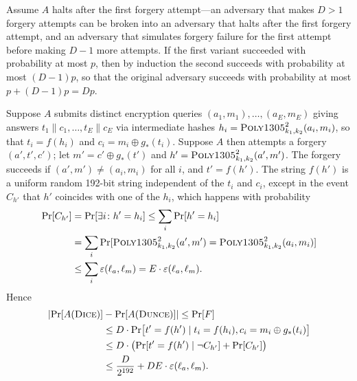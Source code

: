 \documentclass{article}
\def\operatorsc#1{{%
  \ifmmode\let\next=\operatorname\else\let\next=\relax\fi\next{\textsc{#1}}}}
\def\Poly#1/{\operatorsc{Poly#1}}
\def\DUNCE/{\operatorsc{Dunce}}
\def\DICE/{\operatorsc{Dice}}
\newcommand{\concat}{\mathbin\|}
\newcommand{\given}{\mathrel|}
\newcommand{\collisionbound}{\varepsilon}
\begin{document}
Assume $A$ halts after the first forgery attempt---an adversary that
 makes $D>1$ forgery attempts can be broken into an adversary that
 halts after the first forgery attempt, and an adversary that
 simulates forgery failure for the first attempt before making $D-1$
 more attempts.
If the first variant succeeded with probability at most $p$, then by
 induction the second succeeds with probability at most $(D - 1) p$,
 so that the original adversary succeeds with probability at most
 $p + (D - 1) p = D p$.

Suppose $A$ submits distinct encryption queries
 $(a_1, m_1), \dotsc, (a_E, m_E)$
 giving answers
 $t_1 \concat c_1, \dotsc, t_E \concat c_E$
 via intermediate hashes
 $h_i = \Poly1305/^2_{k_1,k_2}(a_i, m_i)$,
 so that $t_i = f(h_i)$ and $c_i = m_i \oplus g_*(t_i)$.
Suppose $A$ then attempts a forgery $(a', t', c')$; let
 $m' = c' \oplus g_*(t')$
 and
 $h' = \Poly1305/^2_{k_1,k_2}(a', m')$.
The forgery succeeds if $(a', m') \ne (a_i, m_i)$ for all $i$, and
 $t' = f(h')$.
The string $f(h')$ is a uniform random 192-bit string independent of
 the $t_i$ and $c_i$, except in the event $C_{h'}$ that $h'$ coincides
 with one of the $h_i$, which happens with probability
%
\begin{align*}
  \Pr[C_{h'}]
  &= \Pr[\exists i\colon h' = h_i]
   \leq \sum_i \Pr[h' = h_i] \\
  &= \sum_i
       \Pr[\Poly1305/^2_{k_1,k_2}(a', m')
             = \Poly1305/^2_{k_1,k_2}(a_i, m_i)] \\
  &\leq \sum_i \collisionbound(\ell_a, \ell_m)
   = E \cdot \collisionbound(\ell_a, \ell_m).
\end{align*}
%
Hence
%
\begin{align*}
  \lvert\Pr[A(\DICE/)] &- \Pr[A(\DUNCE/)]\rvert
   \leq \Pr[F] \\
  &\leq D \cdot \Pr\bigl[t' = f(h')
            \given t_i = f(h_i), c_i = m_i \oplus g_*(t_i)\bigr] \\
  &\leq D \cdot \bigl(\Pr[t' = f(h') \given \lnot C_{h'}]
                      + \Pr[C_{h'}]\bigr) \\
  &\leq \frac{D}{2^{192}}
        + D E \cdot \collisionbound(\ell_a, \ell_m).
\end{align*}
\end{document}
